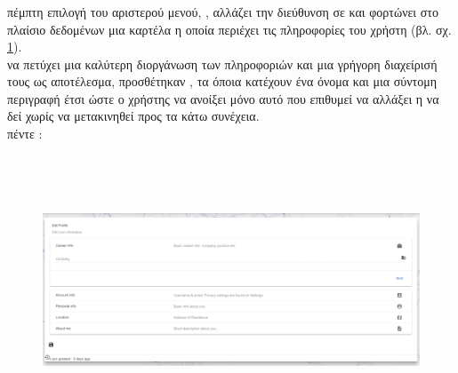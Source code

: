 \subsubsection*{}
 πέμπτη επιλογή του αριστερού μενού, , αλλάζει την διεύθυνση σε  και φορτώνει στο πλαίσιο δεδομένων μια καρτέλα η οποία περιέχει τις πληροφορίες του χρήστη (βλ. σχ. \ref{fig:userProfile}).\\
 να πετύχει μια καλύτερη διοργάνωση των πληροφοριών και μια γρήγορη διαχείρισή τους ως αποτέλεσμα, προσθέτηκαν , τα όποια κατέχουν ένα όνομα και μια σύντομη περιγραφή έτσι ώστε ο χρήστης να ανοίξει μόνο αυτό που επιθυμεί να αλλάξει η να δεί χωρίς να μετακινηθεί προς τα κάτω συνέχεια.\\
 πέντε :\\

\begin{figure}[!htb]
\includegraphics[width=\columnwidth, height=8cm]{images/userProfile.png}
\caption{}
\label{fig:userProfile}
\end{figure}

